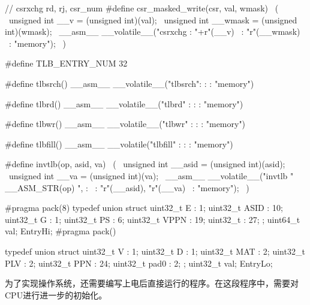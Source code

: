 \begin{CodeBlock}[language=BookC]
// csrxchg rd, rj, csr_num
#define csr_masked_write(csr, val, wmask)                                        \
    ({                                                         \
        unsigned int __v = (unsigned int)(val);          \
        unsigned int __wmask = (unsigned int)(wmask);          \
        __asm__ __volatile__("csrxchg %
                     : "+r"(__v)                          \
                     : "r"(__wmask)                   \
                     : "memory");                  \
    })

#define TLB_ENTRY_NUM 32

#define tlbsrch() __asm__ __volatile__("tlbsrch": : : "memory")

#define tlbrd() __asm__ __volatile__("tlbrd" : : : "memory")

#define tlbwr() __asm__ __volatile__("tlbwr" : : : "memory")

#define tlbfill() __asm__ __volatile("tlbfill" : : : "memory")

#define invtlb(op, asid, va)                                        \
    ({                                                         \
        unsigned int __asid = (unsigned int)(asid);          \
        unsigned int __va = (unsigned int)(va);          \
        __asm__ __volatile__("invtlb " __ASM_STR(op) ", %
                     :                            \
                     : "r"(__asid), "r"(__va)                   \
                     : "memory");                  \
    })

#pragma pack(8)
typedef union {
  struct {
    uint32_t E    : 1;
    uint32_t ASID : 10;
    uint32_t G    : 1;
    uint32_t PS   : 6;
    uint32_t VPPN : 19;
    uint32_t      : 27;    
  };
  uint64_t val;
} EntryHi;
#pragma pack()

typedef union {
  struct {
    uint32_t V     : 1;
    uint32_t D     : 1;
    uint32_t MAT   : 2;
    uint32_t PLV   : 2;
    uint32_t PPN   : 24;
    uint32_t pad0  : 2;
  };
  uint32_t val;  
} EntryLo;
\end{CodeBlock}

为了实现操作系统，还需要编写上电后直接运行的程序。在这段程序中，需要对CPU进行进一步的初始化。

